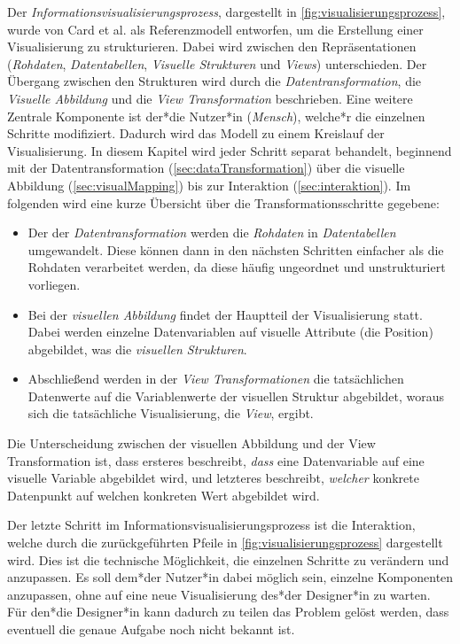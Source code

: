 	Der \emph{Informationsvisualisierungsprozess}, dargestellt in \autoref{fig:visualisierungsprozess}, wurde von Card et al. als Referenzmodell entworfen, um die Erstellung einer Visualisierung zu strukturieren. Dabei wird zwischen den Repräsentationen (\emph{Rohdaten}, \emph{Datentabellen}, \emph{Visuelle Strukturen} und \emph{Views}) unterschieden. Der Übergang zwischen den Strukturen wird durch die \emph{Datentransformation}, die \emph{Visuelle Abbildung} und die \emph{View Transformation} beschrieben. Eine weitere Zentrale Komponente ist der*die Nutzer*in (\emph{Mensch}), welche*r die einzelnen Schritte modifiziert. Dadurch wird das Modell zu einem Kreislauf der Visualisierung. In diesem Kapitel wird jeder Schritt separat behandelt, beginnend mit der Datentransformation (\autoref{sec:dataTransformation}) über die visuelle Abbildung (\autoref{sec:visualMapping}) bis zur Interaktion (\autoref{sec:interaktion}). Im folgenden wird eine kurze Übersicht über die Transformationsschritte gegebene:
	\begin{itemize}
		\item {} Der der \emph{Datentransformation} werden die \emph{Rohdaten} in \emph{Datentabellen} umgewandelt. Diese können dann in den nächsten Schritten einfacher als die Rohdaten verarbeitet werden, da diese häufig ungeordnet und unstrukturiert vorliegen.
		\item {}  Bei der \emph{visuellen Abbildung} findet der Hauptteil der Visualisierung statt. Dabei werden einzelne Datenvariablen auf visuelle Attribute (\bspw die Position) abgebildet, was die \emph{visuellen Strukturen}.
		\item {} Abschließend werden in der \emph{View Transformationen} die tatsächlichen Datenwerte auf die Variablenwerte der visuellen Struktur abgebildet, woraus sich die tatsächliche Visualisierung, die \emph{View}, ergibt.
	\end{itemize}
	Die Unterscheidung zwischen der visuellen Abbildung und der View Transformation ist, dass ersteres beschreibt, \emph{dass} eine Datenvariable auf eine visuelle Variable abgebildet wird, und letzteres beschreibt, \emph{welcher} konkrete Datenpunkt auf welchen konkreten Wert abgebildet wird.

	Der letzte Schritt im Informationsvisualisierungsprozess ist die Interaktion, welche durch die zurückgeführten Pfeile in \autoref{fig:visualisierungsprozess} dargestellt wird. Dies ist die technische Möglichkeit, die einzelnen Schritte zu verändern und anzupassen. Es soll dem*der Nutzer*in dabei möglich sein, einzelne Komponenten anzupassen, ohne auf eine neue Visualisierung des*der Designer*in zu warten. Für den*die Designer*in kann dadurch zu teilen das Problem gelöst werden, dass eventuell die genaue Aufgabe noch nicht bekannt ist.


